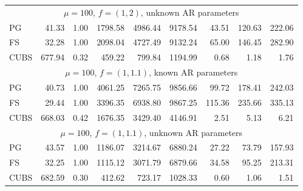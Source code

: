 \documentclass[12pt]{article}
\begin{document}
\begin{table}
\begin{center}
\begin{tabular}{l r r r r r r r r }
      \\ %

      \multicolumn{9}{c}{$\mu=100$, $f = (1,2)$, unknown AR parameters} \\
      PG   &    41.33 &     1.00 &   1798.58 &   4986.44 &   9178.54 &     43.51 &    120.63 &    222.06 \\
      FS   &    32.28 &     1.00 &   2098.04 &   4727.49 &   9132.24 &     65.00 &    146.45 &    282.90 \\
      CUBS   &   677.94 &     0.32 &    459.22 &    799.84 &   1194.99 &      0.68 &      1.18 &      1.76
      \\ %

      \multicolumn{9}{c}{$\mu=100$, $f = (1,1.1)$, known AR parameters} \\
      PG   &    40.73 &     1.00 &   4061.25 &   7265.75 &   9856.66 &     99.72 &    178.41 &    242.03 \\
      FS   &    29.44 &     1.00 &   3396.35 &   6938.80 &   9867.25 &    115.36 &    235.66 &    335.13 \\
      CUBS   &   668.03 &     0.42 &   1676.35 &   3429.40 &   4146.91 &      2.51 &      5.13 &      6.21
      \\ %

      \multicolumn{9}{c}{$\mu=100$, $f = (1,1.1)$, unknown AR parameters} \\
      PG   &    43.57 &     1.00 &   1186.07 &   3214.67 &   6880.24 &     27.22 &     73.79 &    157.93 \\
      FS   &    32.25 &     1.00 &   1115.12 &   3071.79 &   6879.66 &     34.58 &     95.25 &    213.31 \\
      CUBS   &   682.59 &     0.30 &    412.62 &    723.17 &   1028.33 &      0.60 &      1.06 &      1.51
    \end{tabular}
  \end{center}


\end{table}
\end{document}
